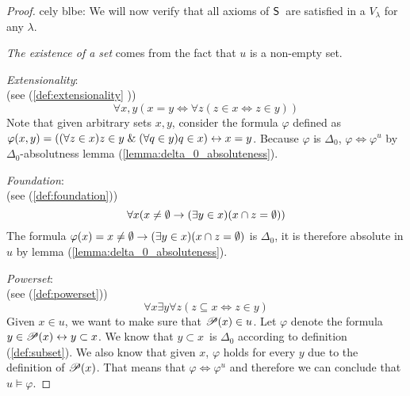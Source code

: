 \begin{proof}
cely blbe: %
We will now verify that all axioms of $\sf{S}$ are satisfied in a $V_\lambda$ for any $\lambda$.

\bce[(i)]
\item \emph{The existence of a set} comes from the fact that $u$ is a non-empty set.

\item \emph{Extensionality}: \\ (see (\ref{def:extensionality} ))
\begin{equation}
\forall x, y (x = y \iff \forall z (z \in x \iff z \in y))
\end{equation}
Note that given arbitrary sets $x, y$, consider the formula $\varphi$ defined as $\varphi(x, y) = ((\forall z \in x) z \in y \mathrel{\&} (\forall q \in y) q \in x) \leftrightarrow x = y$.
Because $\varphi$ is $\Delta_0$, $\varphi \iff \varphi^u$ by $\Delta_0$-absolutness lemma (\ref{lemma:delta_0_absoluteness}).

\item \emph{Foundation}: \\ (see (\ref{def:foundation}))
\begin{equation}
\forall x (x \neq \emptyset \rightarrow (\exists y \in x) (x \cap z = \emptyset))
\end{equation}
The formula $\varphi(x) = x \neq \emptyset \rightarrow (\exists y \in x) (x \cap z = \emptyset)$ is $\Delta_0$, it is therefore absolute in $u$ by lemma (\ref{lemma:delta_0_absoluteness}).

\item \emph{Powerset}: \\ (see (\ref{def:powerset}))
\begin{equation}
\forall x \exists y \forall z (z \subseteq x \iff z \in y)
\end{equation}
Given $x \in u$, we want to make sure that $\mathscr{P} (x) \in u$. Let $\varphi$ denote the formula $y \in \mathscr{P} (x) \leftrightarrow y \subset x$.
We know that $y \subset x$ is $\Delta_0$ according to definition (\ref{def:subset}). We also know that given $x$, $\varphi$ holds for every $y$ due to the definition of $\mathscr{P} (x)$.
That means that $\varphi \iff \varphi^u$ and therefore we can conclude that $u \models \varphi$.



\end{proof}

